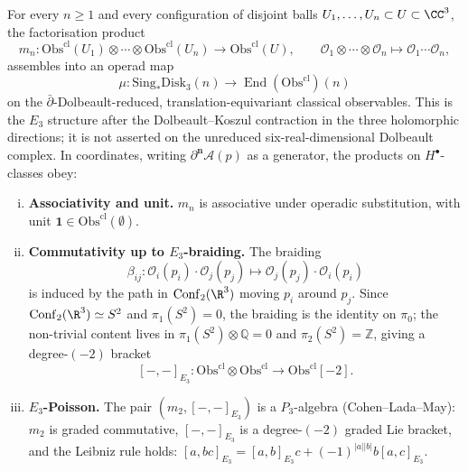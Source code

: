 \begin{theorem}
\label{thm:E3-action-6d-hCS}
For every $n\geq 1$ and every configuration of disjoint balls
$U_1,\dots,U_n\subset U\subset\CC^3$, the factorisation product
\[
m_n\colon
\mathrm{Obs}^{\mathrm{cl}}(U_1)\otimes\cdots\otimes \mathrm{Obs}^{\mathrm{cl}}(U_n)
\longrightarrow
\mathrm{Obs}^{\mathrm{cl}}(U),
\qquad
\mathcal{O}_1\otimes\cdots\otimes\mathcal{O}_n\mapsto \mathcal{O}_1\cdots\mathcal{O}_n,
\]
assembles into an operad map
\[
\mu\colon
\mathrm{Sing}_*\mathrm{Disk}_3(n)
\longrightarrow
\operatorname{End}(\mathrm{Obs}^{\mathrm{cl}})(n)
\]
on the \(\bar\partial\)-Dolbeault-reduced, translation-equivariant
classical observables. This is the \(E_3\) structure after the
Dolbeault--Koszul contraction in the three holomorphic directions; it
is not asserted on the unreduced six-real-dimensional Dolbeault
complex. In coordinates, writing
$\partial^{\mathbf{n}}\mathcal{A}(p)$ as a generator, the products on
$H^\bullet$-classes obey:
\begin{enumerate}[(i)]
\item \textbf{Associativity and unit.} $m_n$ is associative under
operadic substitution, with unit $\mathbf{1}\in \mathrm{Obs}^{\mathrm{cl}}(\emptyset)$.
\item \textbf{Commutativity up to $E_3$-braiding.} The braiding
\[
\beta_{ij}\colon
\mathcal{O}_i(p_i)\cdot \mathcal{O}_j(p_j)\longmapsto
\mathcal{O}_j(p_j)\cdot \mathcal{O}_i(p_i)
\]
is induced by the path in $\mathrm{Conf}_2(\R^3)$ moving $p_i$ around
$p_j$. Since $\mathrm{Conf}_2(\R^3)\simeq S^2$ and $\pi_1(S^2)=0$, the
braiding is the identity on $\pi_0$; the non-trivial content lives in
$\pi_1(S^2)\otimes \mathbb{Q} = 0$ and $\pi_2(S^2)=\mathbb{Z}$, giving
a degree-$(-2)$ bracket
\[
[-,-]_{E_3}\colon
\mathrm{Obs}^{\mathrm{cl}}\otimes \mathrm{Obs}^{\mathrm{cl}}\to \mathrm{Obs}^{\mathrm{cl}}[-2].
\]
\item \textbf{$E_3$-Poisson.} The pair
$(m_2, [-,-]_{E_3})$ is a $P_3$-algebra (Cohen--Lada--May): $m_2$ is
graded commutative, $[-,-]_{E_3}$ is a degree-$(-2)$ graded Lie
bracket, and the Leibniz rule holds:
$[a, bc]_{E_3} = [a,b]_{E_3}c + (-1)^{|a||b|} b[a,c]_{E_3}$.
\end{enumerate}
\end{theorem}

